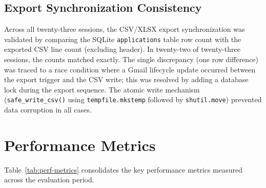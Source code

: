 \documentclass[12pt, a4paper, oneside]{report}
\begin{document}
\subsection{Export Synchronization Consistency}

Across all twenty-three sessions, the CSV/XLSX export synchronization was validated by comparing the SQLite \texttt{applications} table row count with the exported CSV line count (excluding header). In twenty-two of twenty-three sessions, the counts matched exactly. The single discrepancy (one row difference) was traced to a race condition where a Gmail lifecycle update occurred between the export trigger and the CSV write; this was resolved by adding a database lock during the export sequence. The atomic write mechanism (\texttt{safe\_write\_csv()} using \texttt{tempfile.mkstemp} followed by \texttt{shutil.move}) prevented data corruption in all cases.


\section{Performance Metrics}
\label{sec:performance-metrics}

Table~\ref{tab:perf-metrics} consolidates the key performance metrics measured across the evaluation period.
\end{document}
